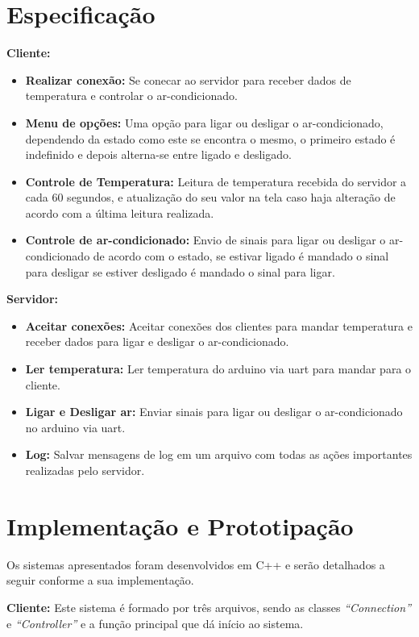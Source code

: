 \documentclass[journal,transmag]{IEEEtran}
\begin{document}
\section{Especificação}
\textbf{Cliente:}

\begin{itemize}
	\item \textbf{Realizar conexão:} Se conecar ao servidor para receber dados de temperatura e controlar o ar-condicionado.
	\item \textbf{Menu de opções:} Uma opção para ligar ou desligar o ar-condicionado, dependendo da estado como este se encontra o mesmo, o primeiro estado é indefinido e depois alterna-se entre ligado e desligado.
	\item \textbf{Controle de Temperatura:} Leitura de temperatura recebida do servidor a cada 60 segundos, e atualização do seu valor na tela caso haja alteração de acordo com a última leitura realizada.
	\item \textbf{Controle de ar-condicionado:} Envio de sinais para ligar ou desligar o ar-condicionado de acordo com o estado, se estivar ligado é mandado o sinal para desligar se estiver desligado é mandado o sinal para ligar.
\end{itemize}

\textbf{Servidor:}

\begin{itemize}
	\item \textbf{Aceitar conexões:} Aceitar conexões dos clientes para mandar temperatura e receber dados para ligar e desligar o ar-condicionado.
	\item \textbf{Ler temperatura:} Ler temperatura do arduino via uart para mandar para o cliente.
	\item \textbf{Ligar e Desligar ar:} Enviar sinais para ligar ou desligar o ar-condicionado no arduino via uart.
	\item \textbf{Log:} Salvar mensagens de log em um arquivo com todas as ações importantes realizadas pelo servidor.
\end{itemize}

\section{Implementação e Prototipação}
Os sistemas apresentados foram desenvolvidos em C++ e serão detalhados a seguir conforme a sua implementação.

\textbf{Cliente:}
Este sistema é formado por três arquivos, sendo as classes \textit{``Connection''} e \textit{``Controller''} e a função principal que dá início ao sistema.
\end{document}
